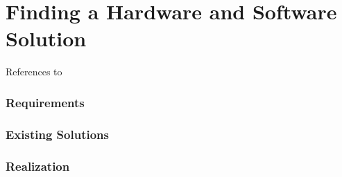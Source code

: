 
\chapter{Finding a Hardware and Software Solution}
References to \cite{kammermann}
\subsection{Requirements}
\subsection{Existing Solutions}
\subsection{Realization}